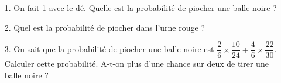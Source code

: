  \begin{enumerate}
    \item[1.] On fait 1 avec le dé. Quelle est la probabilité de piocher une balle noire ? \\ \Pointilles[3] 
    \item[2.] Quel est la probabilité de piocher dans l'urne rouge ? \\ \Pointilles[3] 
    \item[3.] On sait que la probabilité de piocher une balle noire est $\dfrac{2}{6} \times \dfrac{10}{24} + \dfrac{4}{6} \times \dfrac{22}{30}$. \\
    Calculer cette probabilité. A-t-on plus d'une chance sur deux de tirer une balle noire ? \\ \Pointilles[3] 
  \end{enumerate}
  

